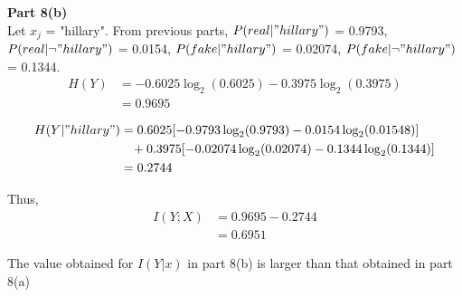 \documentclass{article}
\begin{document}
\textbf{Part 8(b)}\\
Let $x_j$ = "hillary". From previous parts, $P(real|"hillary")$ = 0.9793, $P(real | \neg "hillary")$ = 0.0154, $P(fake|"hillary")$ = 0.02074, $P(fake| \neg "hillary")$ = 0.1344.  \\

\begin{align*}
H(Y) &= - 0.6025 \log_2(0.6025) - 0.3975 \log_2(0.3975) \\ 
&= 0.9695
\end{align*}

\begin{align*} 
H(Y|"hillary") &= 0.6025[ - 0.9793 \log_2(0.9793) - 0.0154 \log_2(0.01548) ]  \\
&\hspace{0.3cm} + 0.3975 [- 0.02074 \log_2(0.02074) - 0.1344 \log_2(0.1344) ] \\
&= 0.2744
\end{align*}

Thus,
\begin{align*}
I(Y;X) &= 0.9695 - 0.2744 \\
&= 0.6951
\end{align*}

The value obtained for $I(Y|x)$ in part 8(b) is larger than that obtained in part 8(a)

\clearpage

\end{document}
